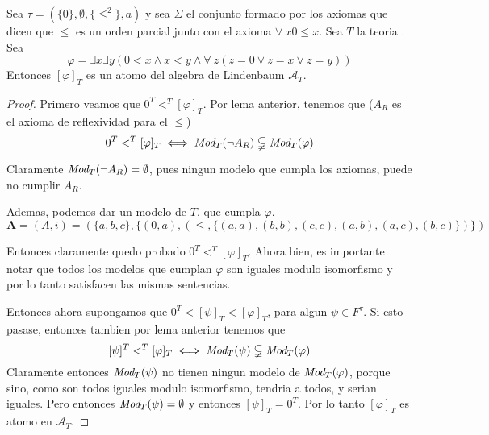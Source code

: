 \begin{remark}
  Sea $\tau = (\{0\},\emptyset,\{\leq^2\},a)$ y sea $\Sigma$ el conjunto formado por los axiomas
  que dicen que $\leq$ es un orden parcial junto con el axioma $\forall\ x 0\leq x$. Sea $T$
  la teoria \forder. Sea
  $$
  \varphi = \exists x \exists y (0 < x \land x < y \land \forall\ z (z = 0 \lor z = x \lor z = y))
  $$
  Entonces $[\varphi]_T$ es un atomo del algebra de Lindenbaum $\mathcal{A}_T$.
\end{remark}
\begin{proof}
  Primero veamos que $0^T <^T [\varphi]_T$. Por lema anterior, tenemos que ($A_R$ es el axioma de reflexividad para el $\leq$)
  $$0^T <^T [\varphi]_T \iff \emph{Mod}_T(\neg A_R)\subsetneqq\emph{Mod}_T(\varphi)$$

  Claramente $\emph{Mod}_T(\neg A_R) = \emptyset$, pues ningun modelo que cumpla los axiomas, puede no cumplir $A_R$.

  Ademas, podemos dar un modelo de $T$, que cumpla $\varphi$.
  $$
    \mathbf{A} = (A, i) = (\{a, b, c\}, \{(0, a), (\leq, \{(a,a),(b,b),(c,c),(a,b),(a,c),(b,c)\})\})
  $$

  Entonces claramente quedo probado $0^T <^T [\varphi]_T$. Ahora bien, es importante notar que todos los modelos que cumplan
  $\varphi$ son iguales modulo isomorfismo y por lo tanto satisfacen las mismas sentencias.

  Entonces ahora supongamos que $0^T < [\psi]_T < [\varphi]_T$, para algun $\psi \in F^\tau$. Si esto pasase, entonces 
  tambien por lema anterior tenemos que
  $$[\psi]^T <^T [\varphi]_T \iff \emph{Mod}_T(\psi)\subsetneqq\emph{Mod}_T(\varphi)$$
  Claramente entonces $\emph{Mod}_T(\psi)$ no tienen ningun modelo de $\emph{Mod}_T(\varphi)$, porque sino, como son todos iguales modulo
  isomorfismo, tendria a todos, y serian iguales. Pero entonces $\emph{Mod}_T(\psi) = \emptyset$ y entonces $[\psi]_T = 0^T$.
  Por lo tanto $[\varphi]_T$ es atomo en $\mathcal{A}_T$.
\end{proof}

